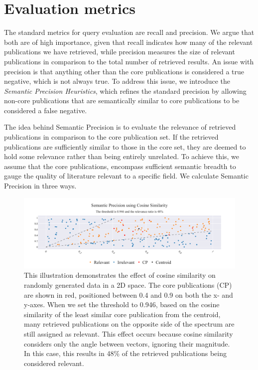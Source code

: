 	

\section{Evaluation metrics}\label{sec:eval-metrics}
The standard metrics for query evaluation are recall and precision. We argue that both are of high importance, given that recall indicates how many of the relevant publications we have retrieved, while precision measures the size of relevant publications in comparison to the total number of retrieved results. An issue with precision is that anything other than the core publications is considered a true negative, which is not always true. To address this issue, we introduce the \textit{Semantic Precision Heuristics}, which refines the standard precision by allowing non-core publications that are semantically similar to core publications to be considered a false negative.

The idea behind Semantic Precision is to evaluate the relevance of retrieved publications in comparison to the core publication set. If the retrieved publications are sufficiently similar to those in the core set, they are deemed to hold some relevance rather than being entirely unrelated. To achieve this, we assume that the core publications, encompass sufficient semantic breadth to gauge the quality of literature relevant to a specific field. We calculate Semantic Precision in three ways.

\begin{figure}
	\hspace*{-1cm}
	\includegraphics[scale=0.48]{pics/sp_cos.pdf}
	\caption[Semantic Precision using Cosine Similarity]{This illustration demonstrates the effect of cosine similarity on randomly generated data in a 2D space. The core publications (CP) are shown in red, positioned between 0.4 and 0.9 on both the x- and y-axes. When we set the threshold to 0.946, based on the cosine similarity of the least similar core publication from the centroid, many retrieved publications on the opposite side of the spectrum are still assigned as relevant. This effect occurs because cosine similarity considers only the angle between vectors, ignoring their magnitude. In this case, this results in 48\% of the retrieved publications being considered relevant.}

	\label{fig:sp-cos}
\end{figure}

